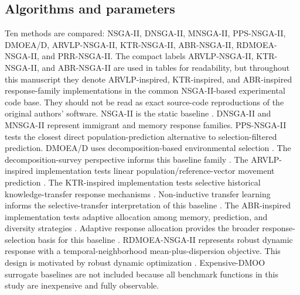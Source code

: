\documentclass[1p,times]{elsarticle}
\begin{document}
\subsection{Algorithms and parameters}
Ten methods are compared: NSGA-II, DNSGA-II, MNSGA-II, PPS-NSGA-II, DMOEA/D, ARVLP-NSGA-II, KTR-NSGA-II, ABR-NSGA-II, RDMOEA-NSGA-II, and PRR-NSGA-II. The compact labels ARVLP-NSGA-II, KTR-NSGA-II, and ABR-NSGA-II are used in tables for readability, but throughout this manuscript they denote ARVLP-inspired, KTR-inspired, and ABR-inspired response-family implementations in the common NSGA-II-based experimental code base. They should not be read as exact source-code reproductions of the original authors' software. NSGA-II is the static baseline \cite{deb2002}. DNSGA-II and MNSGA-II represent immigrant and memory response families. PPS-NSGA-II tests the closest direct population-prediction alternative to selection-filtered prediction. DMOEA/D uses decomposition-based environmental selection \cite{zhang2007}. The decomposition-survey perspective informs this baseline family \cite{trivedi2017}. The ARVLP-inspired implementation tests linear population/reference-vector movement prediction \cite{zheng2023rvcp}. The KTR-inspired implementation tests selective historical knowledge-transfer response mechanisms \cite{wu2023kt}. Non-inductive transfer learning informs the selective-transfer interpretation of this baseline \cite{li2024nitl}. The ABR-inspired implementation tests adaptive allocation among memory, prediction, and diversity strategies \cite{peng2024ab}. Adaptive response allocation provides the broader response-selection basis for this baseline \cite{arms2022}. RDMOEA-NSGA-II represents robust dynamic response with a temporal-neighborhood mean-plus-dispersion objective. This design is motivated by robust dynamic optimization \cite{robust2025pstl}. Expensive-DMOO surrogate baselines are not included because all benchmark functions in this study are inexpensive and fully observable.
\end{document}

